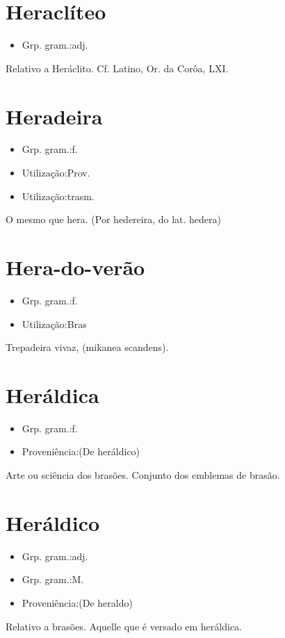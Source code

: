 \documentclass{article}
\begin{document}
\section{Heraclíteo}
\begin{itemize}
\item {Grp. gram.:adj.}
\end{itemize}
Relativo a Heráclito. Cf. Latino, \textunderscore Or. da Corôa\textunderscore , LXI.
\section{Heradeira}
\begin{itemize}
\item {Grp. gram.:f.}
\end{itemize}
\begin{itemize}
\item {Utilização:Prov.}
\end{itemize}
\begin{itemize}
\item {Utilização:trasm.}
\end{itemize}
O mesmo que \textunderscore hera\textunderscore .
(Por \textunderscore hedereira\textunderscore , do lat. \textunderscore hedera\textunderscore )
\section{Hera-do-verão}
\begin{itemize}
\item {Grp. gram.:f.}
\end{itemize}
\begin{itemize}
\item {Utilização:Bras}
\end{itemize}
Trepadeira vivaz, (\textunderscore mikanea scandens\textunderscore ).
\section{Heráldica}
\begin{itemize}
\item {Grp. gram.:f.}
\end{itemize}
\begin{itemize}
\item {Proveniência:(De \textunderscore heráldico\textunderscore )}
\end{itemize}
Arte ou sciência dos brasões.
Conjunto dos emblemas de brasão.
\section{Heráldico}
\begin{itemize}
\item {Grp. gram.:adj.}
\end{itemize}
\begin{itemize}
\item {Grp. gram.:M.}
\end{itemize}
\begin{itemize}
\item {Proveniência:(De \textunderscore heraldo\textunderscore )}
\end{itemize}
Relativo a brasões.
Aquelle que é versado em heráldica.
\end{document}
